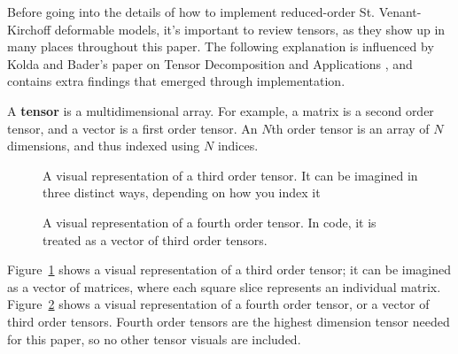 \documentclass[twocolumn,10pt]{asme2ej}
\begin{document}
Before going into the details of how to implement reduced-order St. Venant-Kirchoff deformable models, it's important to review tensors, as they show up in many places throughout this paper. The following explanation is influenced by Kolda and Bader's paper on Tensor Decomposition and Applications \cite{tensors}, and contains extra findings that emerged through implementation.

A \textbf{tensor} is a multidimensional array. For example, a matrix is a second order tensor, and a vector is a first order tensor. An $N$th order tensor is an array of $N$ dimensions, and thus indexed using $N$ indices.

\begin{figure}
\caption{A visual representation of a third order tensor. It can be imagined in three distinct ways, depending on how you index it}
\label{fig_ex1.png}
\end{figure}
\begin{figure}
\caption{A visual representation of a fourth order tensor. In code, it is treated as a vector of third order tensors.}
\label{fig_ex2.png}
\end{figure}

Figure~\ref{fig_ex1.png} shows a visual representation of a third order tensor; it can be imagined as a vector of matrices, where each square slice represents an individual matrix. Figure~\ref{fig_ex2.png} shows a visual representation of a fourth
order tensor, or a vector of third order tensors. Fourth order tensors are the highest dimension tensor needed for this paper, so no other tensor visuals are included.
\end{document}
